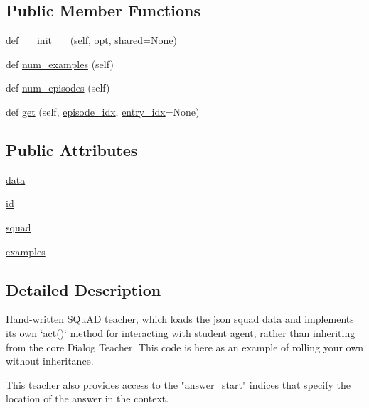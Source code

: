 \subsection*{Public Member Functions}
\begin{DoxyCompactItemize}
\item 
def \hyperlink{classparlai_1_1tasks_1_1squad2_1_1agents_1_1IndexTeacher_a11e053a7da91de71216a538505257ae2}{\+\_\+\+\_\+init\+\_\+\+\_\+} (self, \hyperlink{classparlai_1_1core_1_1agents_1_1Teacher_a3ce6243860ce978a897922863ed32fa4}{opt}, shared=None)
\item 
def \hyperlink{classparlai_1_1tasks_1_1squad2_1_1agents_1_1IndexTeacher_af85b15f1fe388fef825a5df688eac522}{num\+\_\+examples} (self)
\item 
def \hyperlink{classparlai_1_1tasks_1_1squad2_1_1agents_1_1IndexTeacher_aabf2ad3a489d5b1547afa2aaac7b5b79}{num\+\_\+episodes} (self)
\item 
def \hyperlink{classparlai_1_1tasks_1_1squad2_1_1agents_1_1IndexTeacher_a55e2945cb45316a80fc158e8f13eb0ac}{get} (self, \hyperlink{classparlai_1_1core_1_1teachers_1_1FixedDialogTeacher_afd4ebab8063eb42d182d30a1a41f133e}{episode\+\_\+idx}, \hyperlink{classparlai_1_1core_1_1teachers_1_1FixedDialogTeacher_ae3201b15f3c3b46a2f3511bad9b43e7d}{entry\+\_\+idx}=None)
\end{DoxyCompactItemize}
\subsection*{Public Attributes}
\begin{DoxyCompactItemize}
\item 
\hyperlink{classparlai_1_1tasks_1_1squad2_1_1agents_1_1IndexTeacher_abb04c653cc52c06137a52a47c68e02b3}{data}
\item 
\hyperlink{classparlai_1_1tasks_1_1squad2_1_1agents_1_1IndexTeacher_a8d371520b687f1035ce70e88c0ea4e91}{id}
\item 
\hyperlink{classparlai_1_1tasks_1_1squad2_1_1agents_1_1IndexTeacher_a6f328f6c5362d94d609cc8dad6da9fca}{squad}
\item 
\hyperlink{classparlai_1_1tasks_1_1squad2_1_1agents_1_1IndexTeacher_ae83acc001e0059480f6d8a57e260f95b}{examples}
\end{DoxyCompactItemize}


\subsection{Detailed Description}
\begin{DoxyVerb}Hand-written SQuAD teacher, which loads the json squad data and implements its own
`act()` method for interacting with student agent, rather than inheriting from the
core Dialog Teacher. This code is here as an example of rolling your own without
inheritance.

This teacher also provides access to the "answer_start" indices that specify the
location of the answer in the context.
\end{DoxyVerb}
 

